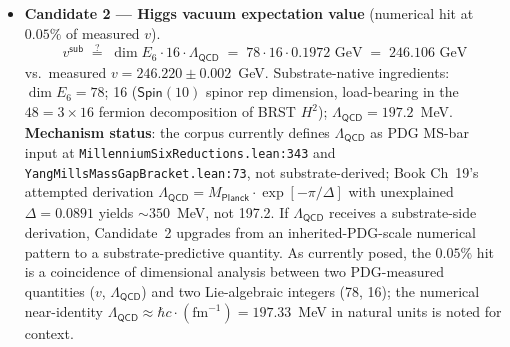 \documentclass[11pt,a4paper]{amsart}
\theoremstyle{plain}
\theoremstyle{definition}
\begin{document}
\begin{itemize}[itemsep=2pt,leftmargin=2em]
\textbf{Mechanism status}: the single-operator eigenvalue-on-$E_6$ reading of $78 \cdot \varphi$ is mathematically closed off (Coxeter-element eigenvalues on the 78-adjoint lie in $\mathbb{Q}(\zeta_{12}) \cap \mathbb{R} = \mathbb{Q}(\sqrt{3})$, which strictly excludes $\varphi \in \mathbb{Q}(\sqrt{5})$; verified in this pass). The product $78 \cdot \varphi$ IS a rigorous algebraic identity: it equals the trace of $(\textsf{id}_{78} \otimes g_5)$ on the 234-dimensional tensor product of the $E_6$-adjoint with the icosahedral standard representation, i.e.\ $78 \cdot \chi_{\textsf{std}}(g_5) = 78 \cdot \varphi$. This is the substrate-shape-compatible three-substrate composition: 78 from the $E_6$ BRST substrate, $\varphi$ from the $H_3$ icosahedral / $\mathbb{Q}(\sqrt{5})$ substrate at the level of a well-defined rep-theoretic trace, and $\ln 3$ from the base-3 ternary substrate. The substrate mechanism identifying this rigorous trace-value with the raw Higgs mass eigenvalue --- and providing the physical mass-scale anchoring in GeV --- has not yet been constructed; the numerical hit is catalogued as pattern data awaiting mechanism.

\item \textbf{Candidate 2 --- Higgs vacuum expectation value} (numerical hit at $0.05\%$ of measured $v$).
\begin{equation*}
v^{\textsf{sub}} \;\stackrel{?}{=}\; \dim E_6 \cdot 16 \cdot \Lambda_{\textsf{QCD}} \;=\; 78 \cdot 16 \cdot 0.1972\text{ GeV} \;=\; 246.106\text{ GeV}
\end{equation*}
vs.\ measured $v = 246.220 \pm 0.002$~GeV. Substrate-native ingredients: $\dim E_6 = 78$; 16 ($\textsf{Spin}(10)$ spinor rep dimension, load-bearing in the $48 = 3 \times 16$ fermion decomposition of BRST $H^2$); $\Lambda_{\textsf{QCD}} = 197.2$~MeV. \textbf{Mechanism status}: the corpus currently defines $\Lambda_{\textsf{QCD}}$ as PDG MS-bar input at \texttt{MillenniumSixReductions.lean:343} and \texttt{YangMillsMassGapBracket.lean:73}, not substrate-derived; Book Ch~19's attempted derivation $\Lambda_{\textsf{QCD}} = M_{\textsf{Planck}} \cdot \exp[-\pi/\Delta]$ with unexplained $\Delta = 0.0891$ yields $\sim 350$~MeV, not 197.2. If $\Lambda_{\textsf{QCD}}$ receives a substrate-side derivation, Candidate~2 upgrades from an inherited-PDG-scale numerical pattern to a substrate-predictive quantity. As currently posed, the $0.05\%$ hit is a coincidence of dimensional analysis between two PDG-measured quantities ($v$, $\Lambda_{\textsf{QCD}}$) and two Lie-algebraic integers (78, 16); the numerical near-identity $\Lambda_{\textsf{QCD}} \approx \hbar c \cdot (\text{fm}^{-1}) = 197.33$~MeV in natural units is noted for context.


\end{itemize}
\end{document}
